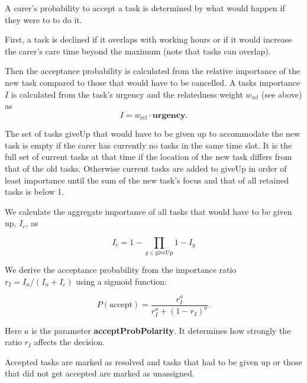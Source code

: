 \documentclass{article}
\begin{document}
A carer's probability to accept a task is determined by what would happen if they were to to do it. 

First, a task is declined if it overlaps with working hours or if it would increase the carer's care time beyond the maximum (note that tasks can overlap). 

Then the acceptance probability is calculated from the relative importance of the new task compared to those that would have to be cancelled. A tasks importance $I$ is calculated from the task's \textsf{urgency} and the relatedness weight $w_\textrm{rel}$ (see above) as 
\[
I = w_\textrm{rel} \cdot \textbf{urgency}.
\]

The set of tasks \textsf{giveUp} that would have to be given up to accommodate the new task is empty if the carer has currently no tasks in the same time slot. It is the full set of current tasks at that time if the location of the new task differs from that of the old tasks. Otherwise current tasks are added to \textsf{giveUp} in order of least importance until the sum of the new task's focus and that of all retained tasks is below 1.

We calculate the aggregate importance of all tasks that would have to be given up, $I_c$, as

\[
I_c = 1-\prod_{g\in\textrm{giveUp}}1-I_g
\]

We derive the acceptance probability from the importance ratio $r_I = I_n/(I_n+I_c)$ using a sigmoid function:

\[
P(\textrm{accept}) = \frac{r_I^a}{r_I^a + (1-r_I)^a}.
\]

Here $a$ is the parameter \textbf{acceptProbPolarity}. It determines how strongly the ratio $r_I$ affects the decision.

Accepted tasks are marked as resolved and tasks that had to be given up or those that did not get accepted are marked as unassigned.
\end{document}

